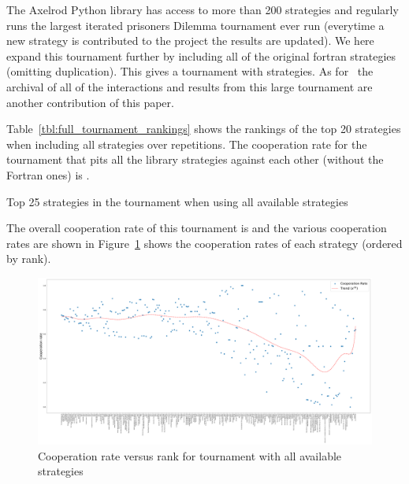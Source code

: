 \documentclass{article}
\begin{document}
The Axelrod Python library has access to more than 200 strategies and regularly
runs the largest iterated prisoners Dilemma tournament ever run (everytime a new
strategy is contributed to the project the results are updated).
We here expand this tournament further by including all of the original fortran
strategies (omitting duplication). This gives a tournament with
 strategies. As
for~\cite{TourExec} the archival of all of the interactions and results from
this large tournament are another contribution of this paper.

Table~\ref{tbl:full_tournament_rankings}
shows the rankings of the top 20 strategies when including all strategies over
repetitions.
The cooperation rate for the tournament that pits all the library strategies
against each other (without the Fortran ones) is
\unskip.

\begin{table}[!hbtp]
        \centering
        \scriptsize
        
        \caption{Top 25 strategies in the tournament when using all available
        strategies}
        \label{tbl:full_tournament_rankings}
\end{table}

The overall cooperation rate of this tournament is
and the various
cooperation rates are shown in
Figure~\ref{fig:full_tournament_cooperation_rate_versus_rank} shows the
cooperation rates of each strategy (ordered by rank).

\begin{figure}[!hbtp]
    \centering
    \includegraphics[width=.8\textwidth]{assets/full_tournament_cooperation_rate_versus_rank.pdf}
    \caption{Cooperation rate versus rank for tournament with all available
    strategies}
    \label{fig:full_tournament_cooperation_rate_versus_rank}
\end{figure}
\end{document}
